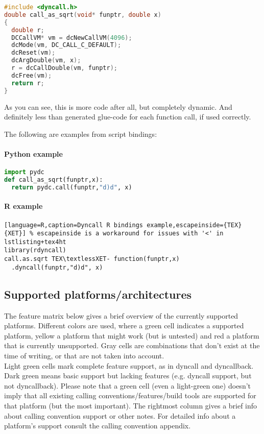 \begin{lstlisting}[language=c,caption=Dyncall C library example]
#include <dyncall.h>
double call_as_sqrt(void* funptr, double x)
{
  double r;
  DCCallVM* vm = dcNewCallVM(4096);
  dcMode(vm, DC_CALL_C_DEFAULT);
  dcReset(vm);
  dcArgDouble(vm, x);  
  r = dcCallDouble(vm, funptr);
  dcFree(vm);
  return r;
}
\end{lstlisting}

As you can see, this is more code after all, but completely dynamic.
And definitely less than generated glue-code for each function call, if
used correctly.

The following are examples from script bindings:

\paragraph{Python example}

\begin{lstlisting}[language=python,caption=Dyncall Python bindings example]
import pydc
def call_as_sqrt(funptr,x):
  return pydc.call(funptr,"d)d", x)
\end{lstlisting}


\paragraph{R example}

\begin{lstlisting}[language=R,caption=Dyncall R bindings example,escapeinside={TEX}{XET}] % escapeinside is a workaround for issues with '<' in lstlisting+tex4ht
library(rdyncall)
call.as.sqrt TEX\textlessXET- function(funptr,x)
  .dyncall(funptr,"d)d", x)
\end{lstlisting}


\pagebreak

\subsection{Supported platforms/architectures}

The feature matrix below gives a brief overview of the currently supported
platforms. Different colors are used, where a green cell indicates a supported
platform, yellow a platform that might work (but is untested) and red a platform
that is currently unsupported. Gray cells are combinations that don't exist
at the time of writing, or that are not taken into account.\\
Light green cells mark complete feature support, as in dyncall and dyncallback. Dark green means basic support but lacking features (e.g. dyncall support, but not dyncallback).
Please note that a green cell (even a light-green one) doesn't imply that all existing calling conventions/features/build tools are supported for that platform (but the most
important). The rightmost column gives a brief info about calling convention support or other notes.
For detailed info about a platform's support consult the calling convention appendix.

